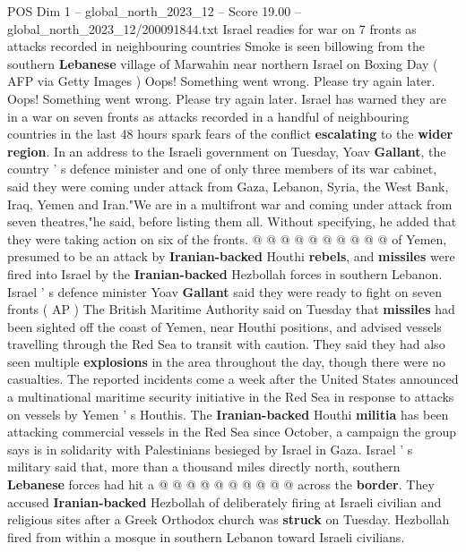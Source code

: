 \begin{textsample}{POS Dim 1 – global\_north\_2023\_12 – Score 19.00 – global\_north\_2023\_12/200091844.txt}  \label{ex:f1_pos_256}
Israel readies for war on 7 fronts as attacks recorded in neighbouring countries Smoke is seen billowing from the southern \textbf{Lebanese} village of Marwahin near northern Israel on Boxing Day ( AFP via Getty Images ) Oops!
Something went wrong.
Please try again later.
Oops!
Something went wrong.
Please try again later.
Israel has warned they are in a war on seven fronts as attacks recorded in a handful of neighbouring countries in the last 48 hours spark fears of the conflict \textbf{escalating} to the \textbf{wider} \textbf{region}.
In an address to the Israeli government on Tuesday, Yoav \textbf{Gallant}, the country ' s defence minister and one of only three members of its war cabinet, said they were coming under attack from Gaza, Lebanon, Syria, the West Bank, Iraq, Yemen and Iran."We are in a multifront war and coming under attack from seven theatres,"he said, before listing them all.
Without specifying, he added that they were taking action on six of the fronts. @ @ @ @ @ @ @ @ @ @ of Yemen, presumed to be an attack by \textbf{Iranian-backed} Houthi \textbf{rebels}, and \textbf{missiles} were fired into Israel by the \textbf{Iranian-backed} Hezbollah forces in southern Lebanon.
Israel ' s defence minister Yoav \textbf{Gallant} said they were ready to fight on seven fronts ( AP ) The British Maritime Authority said on Tuesday that \textbf{missiles} had been sighted off the coast of Yemen, near Houthi positions, and advised vessels travelling through the Red Sea to transit with caution.
They said they had also seen multiple \textbf{explosions} in the area throughout the day, though there were no casualties.
The reported incidents come a week after the United States announced a multinational maritime security initiative in the Red Sea in response to attacks on vessels by Yemen ' s Houthis.
The \textbf{Iranian-backed} Houthi \textbf{militia} has been attacking commercial vessels in the Red Sea since October, a campaign the group says is in solidarity with Palestinians besieged by Israel in Gaza.
Israel ' s military said that, more than a thousand miles directly north, southern \textbf{Lebanese} forces had hit a @ @ @ @ @ @ @ @ @ @ across the \textbf{border}.
They accused \textbf{Iranian-backed} Hezbollah of deliberately firing at Israeli civilian and religious sites after a Greek Orthodox church was \textbf{struck} on Tuesday.
Hezbollah fired from within a mosque in southern Lebanon toward Israeli civilians.

\end{textsample}
